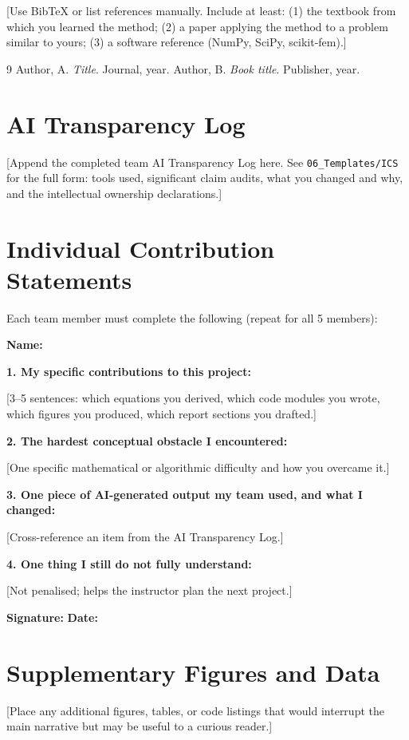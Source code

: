 \documentclass[11pt,a4paper]{article}
\theoremstyle{definition}
\theoremstyle{remark}
\begin{document}
[Use BibTeX or list references manually. Include at least: (1) the textbook from
which you learned the method; (2) a paper applying the method to a problem
similar to yours; (3) a software reference (NumPy, SciPy, scikit-fem).]

\begin{thebibliography}{9}
 Author, A. \emph{Title}. Journal, year.
 Author, B. \emph{Book title}. Publisher, year.
\end{thebibliography}

\newpage
\appendix
\section{AI Transparency Log}

[Append the completed team AI Transparency Log here. See
\texttt{06\_Templates/ICS} for the full form: tools used, significant claim audits,
what you changed and why, and the intellectual ownership declarations.]

\section{Individual Contribution Statements}

Each team member must complete the following (repeat for all 5 members):

\begin{formbox}
\textbf{Name:} \underline{\hspace{5cm}}

\vspace{0.5em}
\textbf{1. My specific contributions to this project:}

[3--5 sentences: which equations you derived, which code modules you wrote,
which figures you produced, which report sections you drafted.]

\vspace{0.5em}
\textbf{2. The hardest conceptual obstacle I encountered:}

[One specific mathematical or algorithmic difficulty and how you overcame it.]

\vspace{0.5em}
\textbf{3. One piece of AI-generated output my team used, and what I changed:}

[Cross-reference an item from the AI Transparency Log.]

\vspace{0.5em}
\textbf{4. One thing I still do not fully understand:}

[Not penalised; helps the instructor plan the next project.]

\vspace{0.5em}
\textbf{Signature:} \underline{\hspace{4cm}} \quad \textbf{Date:} \underline{\hspace{2cm}}
\end{formbox}

\section{Supplementary Figures and Data}

[Place any additional figures, tables, or code listings that would interrupt the
main narrative but may be useful to a curious reader.]
\end{document}
